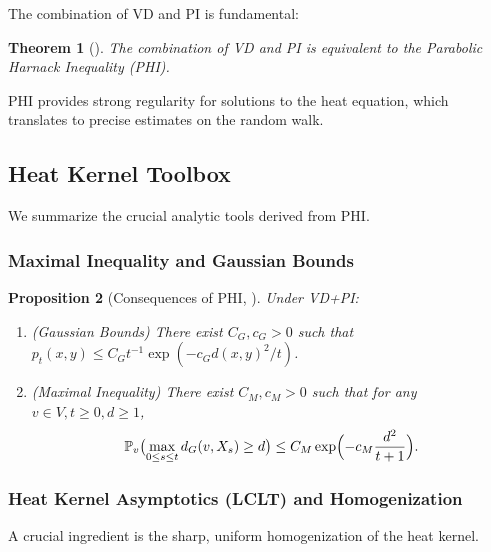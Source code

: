 \documentclass[12pt]{amsart}
\newtheorem{theorem}{Theorem}[section]
\newtheorem{proposition}[theorem]{Proposition}
\theoremstyle{definition}
\theoremstyle{remark}
\newcommand{\Prob}{\mathbb{P}}
\begin{document}
The combination of VD and PI is fundamental:

\begin{theorem}[\cite{Delmotte99}]\label{thm:Delmotte}
The combination of VD and PI is equivalent to the Parabolic Harnack Inequality (PHI).
\end{theorem}

PHI provides strong regularity for solutions to the heat equation, which translates to precise estimates on the random walk.

\subsection{Heat Kernel Toolbox}
We summarize the crucial analytic tools derived from PHI.

\subsubsection{Maximal Inequality and Gaussian Bounds}

\begin{proposition}[Consequences of PHI, \cite{Delmotte99}]\label{prop:maximal}
Under VD+PI:
\begin{enumerate}
    \item (Gaussian Bounds) There exist $C_G, c_G > 0$ such that $p_t(x,y) \leq C_G t^{-1} \exp(-c_G d(x,y)^2/t)$.
    \item (Maximal Inequality) There exist $C_M,c_M > 0$ such that for any $v \in V, t \geq 0, d \geq 1$,
\[
\Prob_v\bigl( \max_{0 \leq s \leq t} d_G(v,X_s) \geq d \bigr) \leq C_M \exp\Bigl(-c_M \frac{d^2}{t+1}\Bigr).
\]
\end{enumerate}
\end{proposition}

\subsubsection{Heat Kernel Asymptotics (LCLT) and Homogenization}
A crucial ingredient is the sharp, uniform homogenization of the heat kernel.
\end{document}

